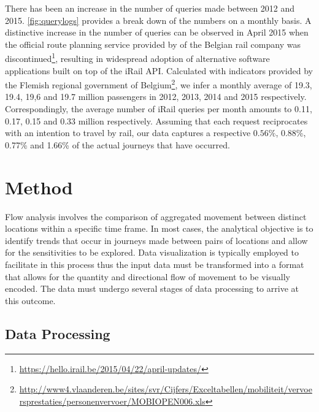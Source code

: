 \documentclass{sig-alternate}
\begin{document}
There has been an increase in the number of queries made between 2012 and 2015. 
\cref{fig:querylogs} provides a break down of the numbers on a monthly basis. 
A distinctive increase in the number of queries can be observed in April 2015 when the official route planning service provided by of the Belgian rail company was discontinued\footnote{\url{https://hello.irail.be/2015/04/22/april-updates/}}, resulting in widespread adoption of alternative software applications built on top of the iRail API.
Calculated with indicators provided by the Flemish regional government of Belgium\footnote{\url{http://www4.vlaanderen.be/sites/svr/Cijfers/Exceltabellen/mobiliteit/vervoersprestaties/personenvervoer/MOBIOPEN006.xls}}, we infer a monthly average of 19.3, 19.4, 19,6 and 19.7 million passengers in 2012, 2013, 2014 and 2015 respectively. 
Correspondingly, the average number of iRail queries per month amounts to 0.11, 0.17, 0.15 and 0.33 million respectively.
Assuming that each request reciprocates with an intention to travel by rail, our data captures a respective $0.56\%$, 0.88\%, 0.77\% and 1.66\% of the actual journeys that have occurred.


\section{Method}
\label{sec:method}

Flow analysis involves the comparison of aggregated movement between distinct locations within a specific time frame. 
In most cases, the analytical objective is to identify trends that occur in journeys made between pairs of locations and allow for the sensitivities to be explored. 
Data visualization is typically employed to facilitate in this process thus the input data must be transformed into a format that allows for the quantity and directional flow of movement to be visually encoded.
The data must undergo several stages of data processing to arrive at this outcome.

\subsection{Data Processing}
\end{document}

